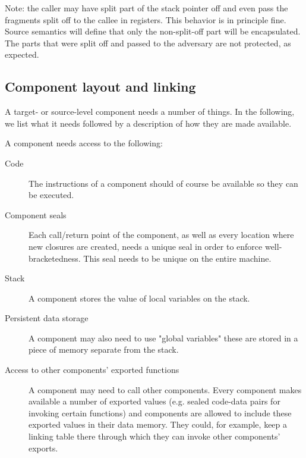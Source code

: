 \documentclass[a4paper]{article}
\begin{document}


Note: the caller may have split part of the stack pointer off and even pass the fragments split off to the callee in registers.
This behavior is in principle fine.
Source semantics will define that only the non-split-off part will be encapsulated.
The parts that were split off and passed to the adversary are not protected, as expected.

\subsection{Component layout and linking}
A target- or source-level component needs a number of things.
In the following, we list what it needs followed by a description of how they are made available.

A component needs access to the following:
\begin{description}
\item[Code] The instructions of a component should of course be available so they can be executed.
\item[Component seals] Each call/return point of the component, as well as every location where new closures are created, needs a unique seal in order to enforce well-bracketedness.
  This seal needs to be unique on the entire machine.
\item[Stack] A component stores the value of local variables on the stack. 
\item[Persistent data storage] A component may also need to use "global variables" these are stored in a piece of memory separate from the stack.
\item[Access to other components' exported functions] A component may need to call other components.
  Every component makes available a number of exported values (e.g. sealed code-data pairs for invoking certain functions) and components are allowed to include these exported values in their data memory.
  They could, for example, keep a linking table there through which they can invoke other components' exports.
\end{description}
\end{document}
